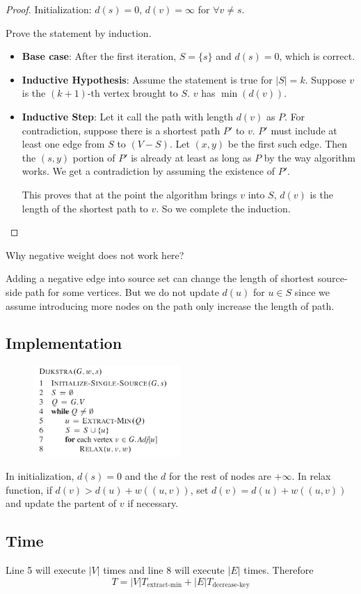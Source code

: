 \begin{proof}
	Initialization: $d(s) = 0$, $d(v) = \infty$ for $\forall v \neq s$.
	
	Prove the statement by induction.
	\begin{itemize}
		\item \textbf{Base case}: After the first iteration, $S = \{s\}$ and $d(s) = 0$, which is correct.
		\item \textbf{Inductive Hypothesis}: Assume the statement is true for $|S| = k$. Suppose $v$ is the $(k+1)$-th vertex brought to $S$. $v$ has $\min(d(v))$.
		\item \textbf{Inductive Step}: Let it call the path with length $d(v)$ as $P$. For contradiction, suppose there is a shortest path $P'$ to $v$. $P'$ must include at least one edge from $S$ to $(V-S)$. Let $(x, y)$ be the first such edge. Then the $(s, y)$ portion of $P'$ is already at least as long as $P$ by the way algorithm works. We get a contradiction by assuming the existence of $P'$.
		
		This proves that at the point the algorithm brings $v$ into $S$, $d(v)$ is the length of the shortest path to $v$. So we complete the induction.
	\end{itemize}
\end{proof}

Why negative weight does not work here?

Adding a negative edge into source set can change the length of shortest source-side path for some vertices. But we do not update $d(u)$ for $u \in S$ since we assume introducing more nodes on the path only increase the length of path.

\subsection{Implementation}
\begin{figure}[H]
	\centering
	\includegraphics[width=0.5\textwidth]{dijkstra-code.png}
\end{figure}
In initialization, $d(s) = 0$ and the $d$ for the rest of nodes are $+\infty$. In relax function, if $d(v) > d(u) + w((u,v))$, set $d(v) = d(u) + w((u,v))$ and update the partent of $v$ if necessary.
\subsection{Time}
Line 5 will execute $|V|$ times and line 8 will execute $|E|$ times. Therefore
\[T = |V|T_{\text{extract-min}} + |E| T_{\text{decrease-key}}\]